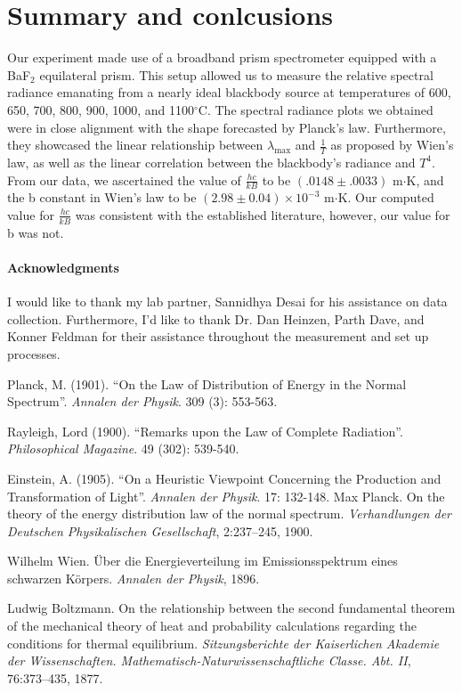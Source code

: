 \documentclass[10pt,letterpaper,onecolumn]{article}
\begin{document}
\section{Summary and conlcusions}

Our experiment made use of a broadband prism spectrometer equipped with a BaF$_2$ equilateral prism. This setup allowed us to measure the relative spectral radiance emanating from a nearly ideal blackbody source at temperatures of 600, 650, 700, 800, 900, 1000, and 1100$^{\circ}$C. The spectral radiance plots we obtained were in close alignment with the shape forecasted by Planck's law. Furthermore, they showcased the linear relationship between $\lambda_{\text{max}}$ and $\frac{1}{T}$ as proposed by Wien's law, as well as the linear correlation between the blackbody's radiance and $T^4$. From our data, we ascertained the value of $\frac{hc}{kB}$ to be $(.0148 \pm .0033)$ m$\cdot$K, and the b constant in Wien's law to be $(2.98\pm0.04)\times10^{-3}$ m$\cdot$K. Our computed value for $\frac{hc}{kB}$ was consistent with the established literature, however, our value for b was not. 
\paragraph*{Acknowledgments}
I would like to thank my lab partner, Sannidhya Desai for his assistance on data
collection. Furthermore, I'd like to thank Dr. Dan Heinzen,
Parth Dave, and Konner Feldman for their assistance throughout the measurement and 
set up processes.





\begin{thebibliography}{9}

Planck, M. (1901). ``On the Law of Distribution of Energy in the Normal Spectrum''. \textit{Annalen der Physik}. 309 (3): 553-563.
  
  Rayleigh, Lord (1900). ``Remarks upon the Law of Complete Radiation''. \textit{Philosophical Magazine}. 49 (302): 539-540.
  
  Einstein, A. (1905). ``On a Heuristic Viewpoint Concerning the Production and Transformation of Light''. \textit{Annalen der Physik}. 17: 132-148.
Max Planck.
\newblock On the theory of the energy distribution law of the normal spectrum.
\newblock \emph{Verhandlungen der Deutschen Physikalischen Gesellschaft}, 2:237–245, 1900.

Wilhelm Wien.
\newblock Über die Energieverteilung im Emissionsspektrum eines schwarzen Körpers.
\newblock \emph{Annalen der Physik}, 1896.

Ludwig Boltzmann.
\newblock On the relationship between the second fundamental theorem of the mechanical theory of heat and probability calculations regarding the conditions for thermal equilibrium.
\newblock \emph{Sitzungsberichte der Kaiserlichen Akademie der Wissenschaften. Mathematisch-Naturwissenschaftliche Classe. Abt. II}, 76:373–435, 1877.


\end{thebibliography}
\end{document}
